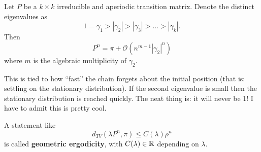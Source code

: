 \documentclass{article}
\begin{document}
\begin{theorem}
    Let $P$ be a $k\times k$ irreducible and aperiodic transition matrix. Denote the distinct eigenvalues as
        \[1=\gamma_1>|\gamma_2|>|\gamma_3|>\ldots>|\gamma_k|.\]Then
        \[P^n=\pi+
    \mathscr{O}(n^{m-1}|\gamma_2|^n)\] where $m$ is the algebraic multiplicity of $\gamma_2$.
\end{theorem}
This is tied to how ``fast'' the chain forgets about the initial position (that is: settling on the stationary distribution). If the second eigenvalue is small then the stationary distribution is reached quickly. The neat thing is: it will never be 1! I have to admit this is pretty cool.
\begin{definition}
    A statement like\[
        d_{TV}(\lambda P^n,\pi)\leqslant C(\lambda)\rho^n
        \] is called \textbf{geometric ergodicity}, with $C(\lambda)\in\mathbb{R}$ depending on $\lambda$.
\end{definition}
\end{document}
